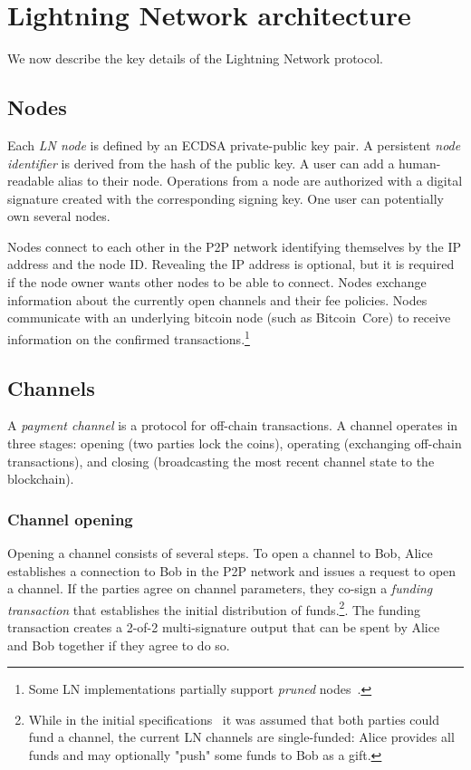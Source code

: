 \section{Lightning Network architecture}
\label{sec:LightningOverview}

We now describe the key details of the Lightning Network protocol.

\subsection{Nodes}

Each \textit{LN node} is defined by an ECDSA private-public key pair.
A persistent \textit{node identifier} is derived from the hash of the public key. 
A user can add a human-readable alias to their node.
Operations from a node are authorized with a digital signature created with the corresponding signing key.
One user can potentially own several nodes.

Nodes connect to each other in the P2P network identifying themselves by the IP address and the node ID\@.
Revealing the IP address is optional, but it is required if the node owner wants other nodes to be able to connect.
Nodes exchange information about the currently open channels and their fee policies.
Nodes communicate with an underlying bitcoin node (such as Bitcoin~Core) to receive information on the confirmed transactions.\footnote{Some LN implementations partially support \textit{pruned} nodes~\cite{LNDInstall}.}


\subsection{Channels}

A \textit{payment channel} is a protocol for off-chain transactions.
A channel operates in three stages: opening (two parties lock the coins), operating (exchanging off-chain transactions), and closing (broadcasting the most recent channel state to the blockchain).


\subsubsection*{Channel opening}

Opening a channel consists of several steps.
To open a channel to Bob, Alice establishes a connection to Bob in the P2P network and issues a request to open a channel.
If the parties agree on channel parameters, they co-sign a \textit{funding transaction} that establishes the initial distribution of funds.\footnote{While in the initial specifications~\cite{Poon2016} it was assumed that both parties could fund a channel, the current LN channels are single-funded: Alice provides all funds and may optionally "push" some funds to Bob as a gift.}.
The funding transaction creates a 2-of-2 multi-signature output that can be spent by Alice and Bob together if they agree to do so.

